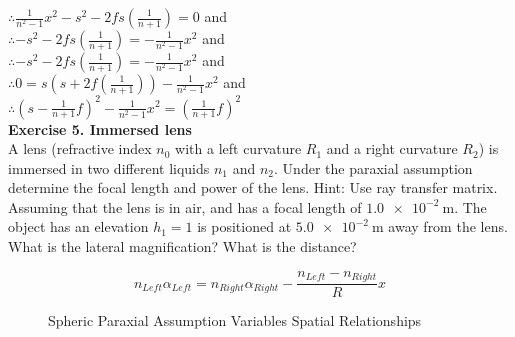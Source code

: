 \documentclass[main.tex]{subfiles}
\begin{document}
$\therefore \frac{1}{n^2 - 1} x^2  - s^2 - 2fs(\frac{1}{n + 1}) = 0$  and \\ 

$\therefore  - s^2 - 2fs(\frac{1}{n + 1}) = -\frac{1}{n^2 - 1} x^2 $  and \\ 

$\therefore  - s^2 - 2fs(\frac{1}{n + 1}) = -\frac{1}{n^2 - 1} x^2 $  and \\ 

$\therefore  0 = s(s + 2f(\frac{1}{n + 1})) -\frac{1}{n^2 - 1} x^2 $  and \\

$\therefore \left(s-\frac{1}{n+1}f \right)^2 - \frac{1}{n^2 - 1}x^2 = \left(\frac{1}{n+1}f \right)^2$ \\

\textbf{Exercise 5. Immersed lens}\\

 A lens (refractive index $n_0$ with a left curvature $R_1$ and a right curvature $R_2$) is immersed in two different liquids $n_1$ and $n_2$. Under the paraxial assumption determine the focal length and power of the lens. Hint: Use ray transfer matrix. Assuming that the lens is in air, and has a focal length of $\SI{1.0e-2}{\meter}$. The object has an elevation $h_1=1$ is positioned at $\SI{5.0e-2}{\meter}$ away from the lens. What is the lateral magnification? What is the distance?


\begin{equation}\label{eq:5a}
n_{Left} \alpha_{Left} = n_{Right} \alpha_{Right} - \frac{n_{Left} - n_{Right}}{R}x
\end{equation}

\begin{figure}
\centering{}
\caption{Spheric Paraxial Assumption Variables Spatial Relationships}
\label{fig:5b}
\end{figure}
\end{document}
